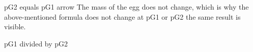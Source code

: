 pG2 equals pG1 arrow The mass of the egg does not change, which is why the above-mentioned formula does not change at pG1 or pG2 the same result is visible.

pG1 divided by pG2
